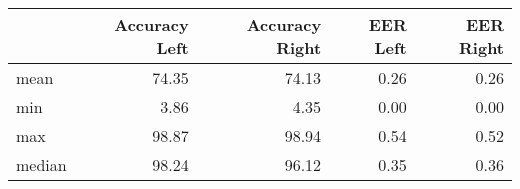 \begin{tabular}{lrrrr}
\toprule
{} &  Accuracy Left &  Accuracy Right &  EER Left &  EER Right \\
\midrule
mean   &          74.35 &           74.13 &      0.26 &       0.26 \\
min    &           3.86 &            4.35 &      0.00 &       0.00 \\
max    &          98.87 &           98.94 &      0.54 &       0.52 \\
median &          98.24 &           96.12 &      0.35 &       0.36 \\
\bottomrule
\end{tabular}
